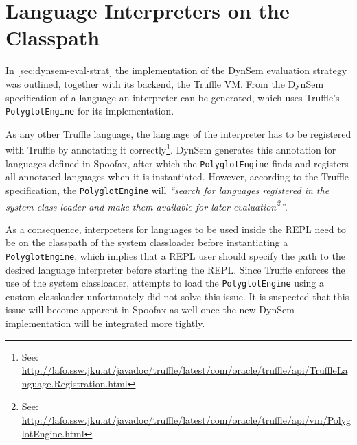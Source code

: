 \section{Language Interpreters on the Classpath}
\label{sec:classpath}

In \cref{sec:dynsem-eval-strat} the implementation of the DynSem evaluation
strategy was outlined, together with its backend, the Truffle VM.  From the
DynSem specification of a language an interpreter can be generated, which uses
Truffle's \texttt{PolyglotEngine} for its implementation.

As any other Truffle language, the language of the interpreter has to be
registered with Truffle by annotating it correctly\footnote{See:
\url{http://lafo.ssw.jku.at/javadoc/truffle/latest/com/oracle/truffle/api/TruffleLanguage.Registration.html}}.
DynSem generates this annotation for languages defined in Spoofax, after which
the \texttt{PolyglotEngine} finds and registers all annotated languages when it
is instantiated. However, according to the Truffle specification, the
\texttt{PolyglotEngine} will \textit{``search for languages registered in the system class
loader and make them available for later evaluation\footnote{See:
\url{http://lafo.ssw.jku.at/javadoc/truffle/latest/com/oracle/truffle/api/vm/PolyglotEngine.html}}''}.

As a consequence, interpreters for languages to be used inside the REPL need to
be on the classpath of the system classloader before instantiating a
\texttt{PolyglotEngine}, which implies that a REPL user should specify the path to
the desired language interpreter before starting the REPL. Since Truffle
enforces the use of the system classloader, attempts to load the
\texttt{PolyglotEngine} using a custom classloader unfortunately did not solve this
issue. It is suspected that this issue will become apparent in Spoofax as well
once the new DynSem implementation will be integrated more tightly.

